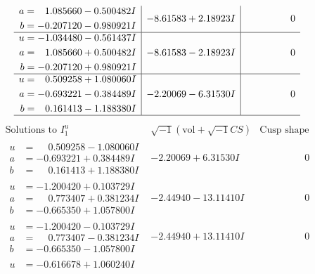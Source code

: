 \documentclass[1p]{elsarticle_modified}
\theoremstyle{definition}
\newcommand{\I}{\sqrt{-1}}
\begin{document}
$$\begin{array}{c|c|c}
\begin{aligned}
a &= \phantom{-}1.085660 - 0.500482 I \\
b &= -0.207120 - 0.980921 I\end{aligned}
 & -8.61583 + 2.18923 I & \phantom{-0.000000 } 0 \\ \hline\begin{aligned}
u &= -1.034480 - 0.561437 I \\
a &= \phantom{-}1.085660 + 0.500482 I \\
b &= -0.207120 + 0.980921 I\end{aligned}
 & -8.61583 - 2.18923 I & \phantom{-0.000000 } 0 \\ \hline\begin{aligned}
u &= \phantom{-}0.509258 + 1.080060 I \\
a &= -0.693221 - 0.384489 I \\
b &= \phantom{-}0.161413 - 1.188380 I\end{aligned}
 & -2.20069 - 6.31530 I & \phantom{-0.000000 } 0\\
 \hline 
 \end{array}$$\newpage$$\begin{array}{c|c|c}  
\text{Solutions to }I^u_{1}& \I (\text{vol} + \sqrt{-1}CS) & \text{Cusp shape}\\
 \hline 
\begin{aligned}
u &= \phantom{-}0.509258 - 1.080060 I \\
a &= -0.693221 + 0.384489 I \\
b &= \phantom{-}0.161413 + 1.188380 I\end{aligned}
 & -2.20069 + 6.31530 I & \phantom{-0.000000 } 0 \\ \hline\begin{aligned}
u &= -1.200420 + 0.103729 I \\
a &= \phantom{-}0.773407 + 0.381234 I \\
b &= -0.665350 + 1.057800 I\end{aligned}
 & -2.44940 - 13.11410 I & \phantom{-0.000000 } 0 \\ \hline\begin{aligned}
u &= -1.200420 - 0.103729 I \\
a &= \phantom{-}0.773407 - 0.381234 I \\
b &= -0.665350 - 1.057800 I\end{aligned}
 & -2.44940 + 13.11410 I & \phantom{-0.000000 } 0 \\ \hline\begin{aligned}
u &= -0.616678 + 1.060240 I \\

\end{aligned}
\end{array}$$
\end{document}
